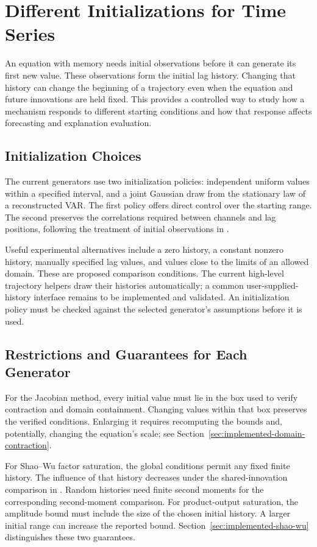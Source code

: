 \section{Different Initializations for Time Series}
\label{sec:time-series-initialization}

An equation with memory needs initial observations before it can generate its
first new value. These observations form the initial lag history. Changing
that history can change the beginning of a trajectory even when the equation
and future innovations are held fixed. This provides a controlled way to
study how a mechanism responds to different starting conditions and how that
response affects forecasting and explanation evaluation.

\subsection{Initialization Choices}
The current generators use two initialization policies: independent uniform
values within a specified interval, and a joint Gaussian draw from the
stationary law of a reconstructed VAR. The first policy offers direct control
over the starting range. The second preserves the correlations required
between channels and lag positions, following the treatment of initial
observations in \citet[Section~4 and Appendix]{heaps2023stationarity}.

Useful experimental alternatives include a zero history, a constant nonzero
history, manually specified lag values, and values close to the limits of
an allowed domain. These are proposed comparison conditions. The current
high-level trajectory helpers draw their histories automatically; a common
user-supplied-history interface remains to be implemented and validated.
An initialization policy must be checked against the selected generator's
assumptions before it is used.

\subsection{Restrictions and Guarantees for Each Generator}
For the Jacobian method, every initial value must lie in the box used to
verify contraction and domain containment. Changing values within that box
preserves the verified conditions. Enlarging it requires recomputing the
bounds and, potentially, changing the equation's scale; see
Section~\ref{sec:implemented-domain-contraction}.

For Shao--Wu factor saturation, the global conditions permit any fixed finite
history. The influence of that history decreases under the shared-innovation
comparison in \citet[Theorem~5.1 and its proof]{shao2007spectral}. Random
histories need finite second moments for the corresponding second-moment
comparison. For product-output saturation, the amplitude bound must include
the size of the chosen initial history. A larger initial range can increase
the reported bound. Section~\ref{sec:implemented-shao-wu} distinguishes these
two guarantees.

